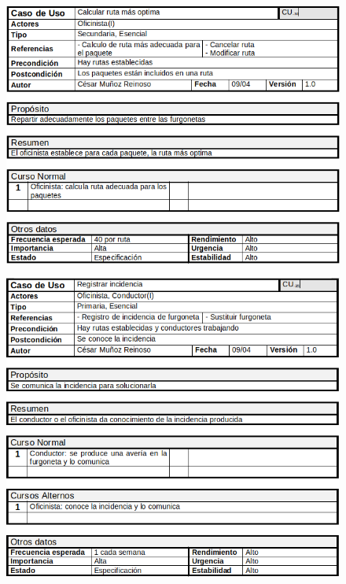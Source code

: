 \begin{figure}[H]
	\centering
	\includegraphics[width=16cm]{34}
\end{figure}
\begin{figure}[H]
	\centering
	\includegraphics[width=16cm]{35}
\end{figure}
